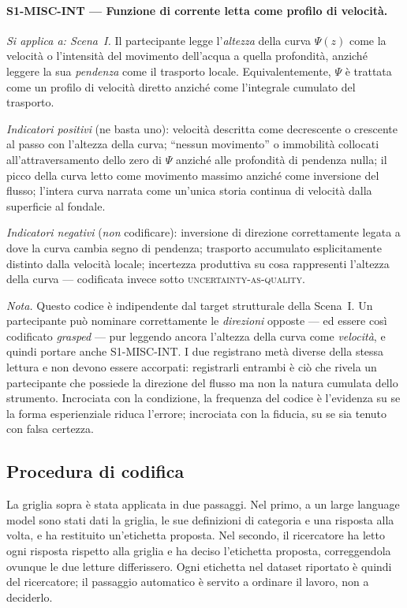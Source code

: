\paragraph{S1-MISC-INT --- Funzione di corrente letta come profilo di velocità.}
\emph{Si applica a: Scena~I.} Il partecipante legge l'\emph{altezza} della curva $\Psi(z)$ come la velocità o l'intensità del movimento dell'acqua a quella profondità, anziché leggere la sua \emph{pendenza} come il trasporto locale. Equivalentemente, $\Psi$ è trattata come un profilo di velocità diretto anziché come l'integrale cumulato del trasporto.

\emph{Indicatori positivi} (ne basta uno): velocità descritta come decrescente o crescente al passo con l'altezza della curva; ``nessun movimento'' o immobilità collocati all'attraversamento dello zero di $\Psi$ anziché alle profondità di pendenza nulla; il picco della curva letto come movimento massimo anziché come inversione del flusso; l'intera curva narrata come un'unica storia continua di velocità dalla superficie al fondale.

\emph{Indicatori negativi} (\emph{non} codificare): inversione di direzione correttamente legata a dove la curva cambia segno di pendenza; trasporto accumulato esplicitamente distinto dalla velocità locale; incertezza produttiva su cosa rappresenti l'altezza della curva --- codificata invece sotto \textsc{uncertainty-as-quality}.

\emph{Nota.} Questo codice è indipendente dal target strutturale della Scena~I. Un partecipante può nominare correttamente le \emph{direzioni} opposte --- ed essere così codificato \emph{grasped} --- pur leggendo ancora l'altezza della curva come \emph{velocità}, e quindi portare anche S1-MISC-INT. I due registrano metà diverse della stessa lettura e non devono essere accorpati: registrarli entrambi è ciò che rivela un partecipante che possiede la direzione del flusso ma non la natura cumulata dello strumento. Incrociata con la condizione, la frequenza del codice è l'evidenza su se la forma esperienziale riduca l'errore; incrociata con la fiducia, su se sia tenuto con falsa certezza.

\subsection{Procedura di codifica}
\label{subsec:app-procedure}

La griglia sopra è stata applicata in due passaggi. Nel primo, a un large language model sono stati
dati la griglia, le sue definizioni di categoria e una risposta alla volta, e ha restituito
un'etichetta proposta. Nel secondo, il ricercatore ha letto ogni risposta rispetto alla griglia e ha
deciso l'etichetta proposta, correggendola ovunque le due letture differissero. Ogni etichetta nel
dataset riportato è quindi del ricercatore; il passaggio automatico è servito a ordinare il lavoro,
non a deciderlo.

